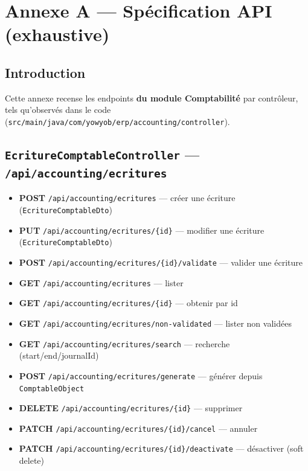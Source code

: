 \chapter{Annexe A --- Spécification API (exhaustive)}
\label{annexe:api}

\section{Introduction}
Cette annexe recense les endpoints \textbf{du module Comptabilité} par contrôleur, tels qu'observés dans le code (\texttt{src/main/java/com/yowyob/erp/accounting/controller}).

\section{\texttt{EcritureComptableController} --- \texttt{/api/accounting/ecritures}}
\begin{itemize}
  \item \textbf{POST} \texttt{/api/accounting/ecritures} --- créer une écriture (\texttt{EcritureComptableDto})
  \item \textbf{PUT} \texttt{/api/accounting/ecritures/\{id\}} --- modifier une écriture (\texttt{EcritureComptableDto})
  \item \textbf{POST} \texttt{/api/accounting/ecritures/\{id\}/validate} --- valider une écriture
  \item \textbf{GET} \texttt{/api/accounting/ecritures} --- lister
  \item \textbf{GET} \texttt{/api/accounting/ecritures/\{id\}} --- obtenir par id
  \item \textbf{GET} \texttt{/api/accounting/ecritures/non-validated} --- lister non validées
  \item \textbf{GET} \texttt{/api/accounting/ecritures/search} --- recherche (start/end/journalId)
  \item \textbf{POST} \texttt{/api/accounting/ecritures/generate} --- générer depuis \texttt{ComptableObject}
  \item \textbf{DELETE} \texttt{/api/accounting/ecritures/\{id\}} --- supprimer
  \item \textbf{PATCH} \texttt{/api/accounting/ecritures/\{id\}/cancel} --- annuler
  \item \textbf{PATCH} \texttt{/api/accounting/ecritures/\{id\}/deactivate} --- désactiver (soft delete)
\end{itemize}

